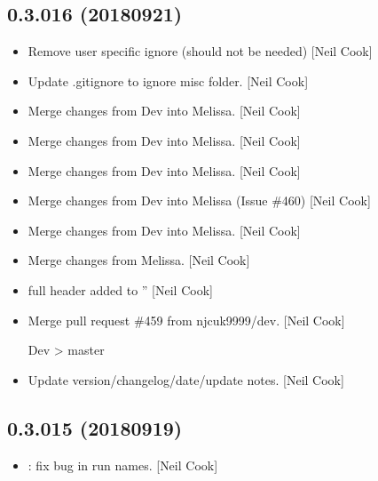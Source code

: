 \documentclass[a4paper,10pt,english]{report}
\begin{document}
\subsection{0.3.016 (2018\sphinxhyphen{}09\sphinxhyphen{}21)}
\label{\detokenize{misc/changelog:id335}}\begin{itemize}
\item {} 
Remove user specific ignore (should not be needed) {[}Neil Cook{]}

\item {} 
Update .gitignore to ignore misc folder. {[}Neil Cook{]}

\item {} 
 \sphinxhyphen{} Merge changes from Dev into Melissa. {[}Neil Cook{]}

\item {} 
 \sphinxhyphen{} Merge changes from Dev into Melissa. {[}Neil Cook{]}

\item {} 
 \sphinxhyphen{} Merge changes from Dev into Melissa. {[}Neil Cook{]}

\item {} 
 \sphinxhyphen{} Merge changes from Dev into Melissa (Issue \#460) {[}Neil
Cook{]}

\item {} 
 \sphinxhyphen{} Merge changes from Dev into Melissa. {[}Neil
Cook{]}

\item {} 
 \sphinxhyphen{} Merge changes from Melissa. {[}Neil Cook{]}

\item {} 
 \sphinxhyphen{} full header added to ” {[}Neil
Cook{]}

\item {} 
Merge pull request \#459 from njcuk9999/dev. {[}Neil Cook{]}

Dev \textendash{}\textgreater{} master

\item {} 
Update version/changelog/date/update notes. {[}Neil Cook{]}

\end{itemize}


\subsection{0.3.015 (2018\sphinxhyphen{}09\sphinxhyphen{}19)}
\label{\detokenize{misc/changelog:id336}}\begin{itemize}
\item {} 
: fix bug in run names. {[}Neil Cook{]}

\end{itemize}
\end{document}
